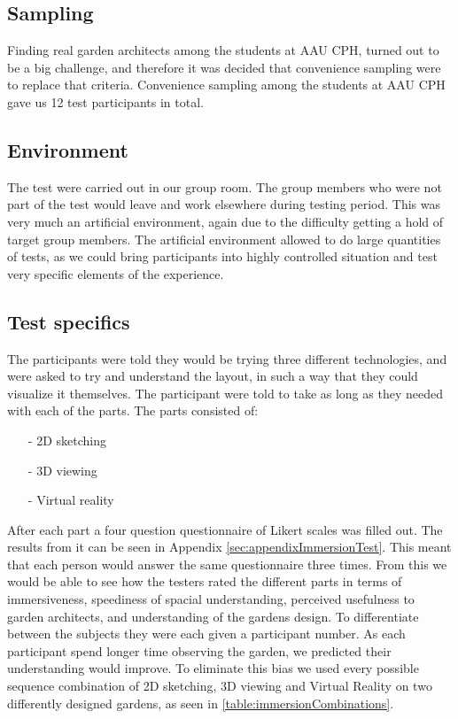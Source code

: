 \subsection{Sampling}
Finding real garden architects among the students at AAU CPH, turned out to be a big challenge, and therefore it was decided that convenience sampling were to replace that criteria. Convenience sampling among the students at AAU CPH gave us 12 test participants in total.
\subsection{Environment}
The test were carried out in our group room. The group members who were not part of the test would leave and work elsewhere during testing period. This was very much an artificial environment, again due to the difficulty getting a hold of target group members. The artificial environment allowed to do large quantities of tests, as we could bring participants into highly controlled situation and test very specific elements of the experience.\cite[p.~64]{bjoernerBog}
\subsection{Test specifics}
The participants were told they would be trying three different technologies, and were asked to try and understand the layout, in such a way that they could visualize it themselves. The participant were told to take as long as they needed with each of the parts. The parts consisted of:
\begin{itemize}
	\item[-] 2D sketching
	\item[-] 3D viewing
	\item[-] Virtual reality
\end{itemize}
After each part a four question questionnaire of Likert scales was filled out. The results from it can be seen in Appendix \ref{sec:appendixImmersionTest}. This meant that each person would answer the same questionnaire three times. From this we would be able to see how the testers rated the different parts in terms of immersiveness, speediness of spacial understanding, perceived usefulness to garden architects, and understanding of the gardens design. To differentiate between the subjects they were each given a participant number. As each participant spend longer time observing the garden, we predicted their understanding would improve. To eliminate this bias we used every possible sequence combination of 2D sketching, 3D viewing and Virtual Reality on two differently designed gardens, as seen in \autoref{table:immersionCombinations}.

